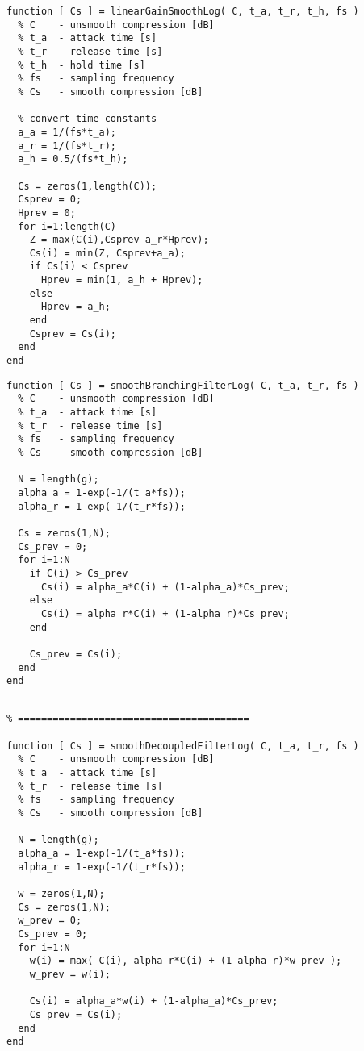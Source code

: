 \documentclass[../main2.tex]{subfiles}
\begin{document}

\begin{lstlisting}[style=customc]
function [ Cs ] = linearGainSmoothLog( C, t_a, t_r, t_h, fs )
  % C    - unsmooth compression [dB]
  % t_a  - attack time [s]
  % t_r  - release time [s]
  % t_h  - hold time [s]
  % fs   - sampling frequency
  % Cs   - smooth compression [dB]

  % convert time constants
  a_a = 1/(fs*t_a);
  a_r = 1/(fs*t_r);
  a_h = 0.5/(fs*t_h);
    
  Cs = zeros(1,length(C));
  Csprev = 0;
  Hprev = 0;
  for i=1:length(C)
    Z = max(C(i),Csprev-a_r*Hprev);
    Cs(i) = min(Z, Csprev+a_a); 
    if Cs(i) < Csprev
      Hprev = min(1, a_h + Hprev);
    else 
      Hprev = a_h;
    end
    Csprev = Cs(i);
  end
end
\end{lstlisting}


\begin{lstlisting}[style=customc]
function [ Cs ] = smoothBranchingFilterLog( C, t_a, t_r, fs )
  % C    - unsmooth compression [dB]
  % t_a  - attack time [s]
  % t_r  - release time [s]
  % fs   - sampling frequency
  % Cs   - smooth compression [dB]

  N = length(g);
  alpha_a = 1-exp(-1/(t_a*fs));
  alpha_r = 1-exp(-1/(t_r*fs));
    
  Cs = zeros(1,N);
  Cs_prev = 0;
  for i=1:N
    if C(i) > Cs_prev
      Cs(i) = alpha_a*C(i) + (1-alpha_a)*Cs_prev;
    else
      Cs(i) = alpha_r*C(i) + (1-alpha_r)*Cs_prev;
    end
    
    Cs_prev = Cs(i);
  end
end
\end{lstlisting}
\begin{lstlisting}[style=customc]

% ========================================

function [ Cs ] = smoothDecoupledFilterLog( C, t_a, t_r, fs )
  % C    - unsmooth compression [dB]
  % t_a  - attack time [s]
  % t_r  - release time [s]
  % fs   - sampling frequency 
  % Cs   - smooth compression [dB]

  N = length(g);
  alpha_a = 1-exp(-1/(t_a*fs));
  alpha_r = 1-exp(-1/(t_r*fs));
    
  w = zeros(1,N);
  Cs = zeros(1,N);
  w_prev = 0;
  Cs_prev = 0;
  for i=1:N
    w(i) = max( C(i), alpha_r*C(i) + (1-alpha_r)*w_prev );
    w_prev = w(i);
    
    Cs(i) = alpha_a*w(i) + (1-alpha_a)*Cs_prev;
    Cs_prev = Cs(i);
  end
end
\end{lstlisting}
\end{document}
